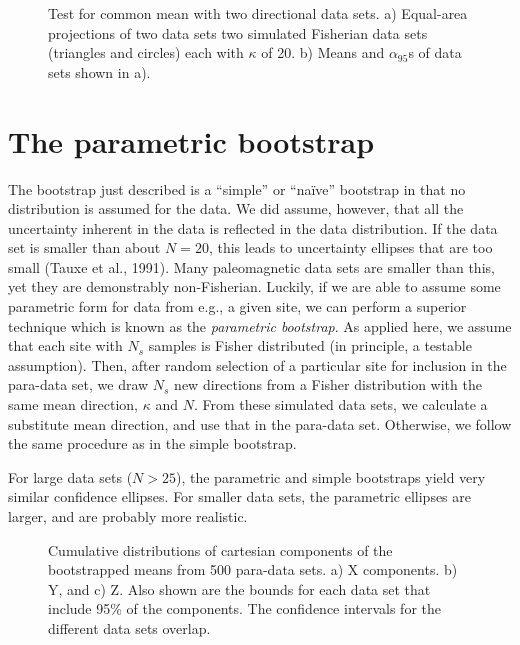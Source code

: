 \begin{figure}[htb]
\epsfxsize 11cm
\centering {}
\caption {Test for common mean with two directional data sets. 
a) Equal-area projections of  two data sets two
simulated Fisherian data sets  (triangles and circles) each with $\kappa$ of 20.  b) Means and $\alpha_{95}$s of  data sets shown in a).  }
\label{fig:twofiles}
\end{figure}


\section {The parametric bootstrap}


The bootstrap just described is a  ``simple'' or ``na\"ive'' bootstrap in that
no distribution is assumed for the data.  We did assume, however, that all the
uncertainty inherent in the data is reflected in the data distribution.
 If the data set is smaller than about $N=20$, this leads to
uncertainty ellipses that are too small  
(Tauxe et al., 1991).  \nocite{tauxe91}
Many paleomagnetic data sets are smaller than this,  yet they
are demonstrably non-Fisherian.  Luckily, if we are able to assume some
parametric form for  data from e.g.,  a given site, we can perform a superior
technique which is known as the 
{\it parametric bootstrap}.  As applied here, we assume
that each site with $N_s$ samples is Fisher distributed (in principle,
a testable assumption).
Then, after random selection of a particular site for inclusion in the 
para-data set, we draw $N_s$ new directions from a Fisher distribution with the
same mean direction, $\kappa$ and $N$. From these simulated data sets, we calculate a 
substitute mean direction, and use that
in the para-data set.  Otherwise, we follow the same procedure as
in the simple bootstrap.

For large data sets ($N>25$), the parametric and simple bootstraps yield
very similar confidence ellipses.   For smaller data sets, the parametric ellipses
are larger, and are probably more realistic.  


\begin{figure}[htb]
\epsfxsize 15cm
\centering {}
\caption{
Cumulative distributions of 
cartesian  components  of the bootstrapped means from 500 para-data sets. a) X components.  b) Y, and c) Z.
Also shown are the bounds for each data set that include 95\% of the 
components.
The confidence intervals for the different data sets 
overlap.
  }
  \label{fig:cdf}
  \end{figure}



